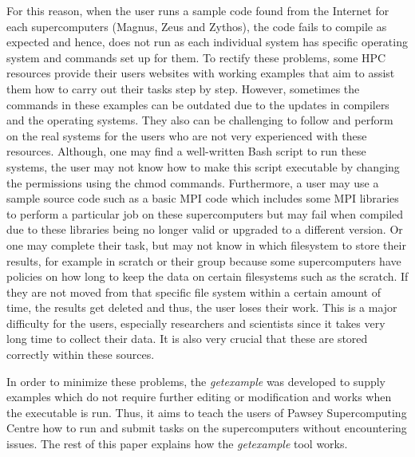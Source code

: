 For this reason, when the user runs a sample code found from the Internet for each supercomputers (Magnus, Zeus and Zythos), the code fails to compile 
as expected and hence, does not run as each individual system has specific operating system and commands set up for them. To rectify these problems, 
some HPC resources provide their users websites with working examples that aim to assist them how to carry out their tasks step by step. 
However, sometimes the commands in these examples can be outdated due to the updates in compilers and the operating systems. They also can be challenging 
to follow and perform on the real systems for the users who are not very experienced with these resources. Although, one may find a well-written Bash 
script to run these systems, the user may not know how to make this script executable by changing the permissions using the chmod commands. Furthermore, a user 
may use a sample source code such as a basic MPI code which includes some MPI libraries to perform a particular job on these supercomputers but may 
fail when compiled due to these libraries being no longer valid or upgraded to a different version. Or one may complete their task, but may 
not know in which filesystem to store their results, for example in scratch or their group because some supercomputers have policies on how long to keep 
the data on certain filesystems such as the scratch. If they are not moved from that specific file system within a certain amount of time, the results get 
deleted and thus, the user loses their work. This is a major difficulty for the users, especially researchers and scientists since it takes very long time 
to collect their data. It is also very crucial that these are stored correctly within these sources.

In order to minimize these problems, the \emph{getexample} was developed to supply examples which do not require further editing or modification and works
when the executable is run. Thus, it aims to teach the users of Pawsey Supercomputing Centre how to run and submit tasks on the supercomputers without 
encountering issues. The rest of this paper explains how the \emph{getexample} tool works.   




